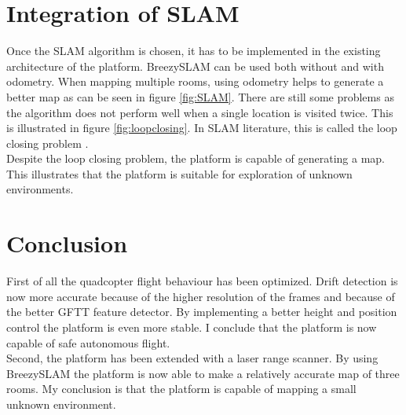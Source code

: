 \documentclass[twocolumn]{phdsymp} %
\begin{document}
\section{Integration of SLAM}
Once the SLAM algorithm is chosen, it has to be implemented in the existing architecture of the platform. BreezySLAM can be used both without and with odometry. When mapping multiple rooms, using odometry helps to generate a better map as can be seen in figure \ref{fig:SLAM}. There are still some problems as the algorithm does not perform well when a single location is visited twice. This is illustrated in figure \ref{fig:loopclosing}. In SLAM literature, this is called the loop closing problem \cite{book:SLAMHandbook}.\\
Despite the loop closing problem, the platform is capable of generating a map. This illustrates that the platform is suitable for exploration of unknown environments.

\section{Conclusion}
First of all the quadcopter flight behaviour has been optimized. Drift detection is now more accurate because of the higher resolution of the frames and because of the better GFTT feature detector. By implementing a better height and position control the platform is even more stable. I conclude that the platform is now capable of safe autonomous flight.\\
Second, the platform has been extended with a laser range scanner. By using BreezySLAM the platform is now able to make a relatively accurate map of three rooms. My conclusion is that the platform is capable of mapping a small unknown environment.



\end{document}

